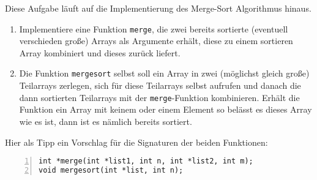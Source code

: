 \documentclass{uebungszettel}
\begin{document}
\begin{aufg}
Diese Aufgabe läuft auf die Implementierung des Merge-Sort Algorithmus hinaus.
\begin{enumerate}
\item Implementiere eine Funktion \verb|merge|, die zwei bereits sortierte (eventuell verschieden große) Arrays als Argumente erhält, diese zu einem sortieren Array kombiniert und dieses zurück liefert. 
\item Die Funktion \verb|mergesort| selbst soll ein Array in zwei (möglichst gleich große) Teilarrays zerlegen, sich für diese Teilarrays selbst aufrufen und danach die dann sortierten Teilarrays mit der \verb|merge|-Funktion kombinieren. Erhält die Funktion ein Array mit keinem oder einem Element so belässt es dieses Array wie es ist, dann ist es nämlich bereits sortiert.
\end{enumerate}

Hier als Tipp ein Vorschlag für die Signaturen der beiden Funktionen:
\begin{codelisting}
\begin{lstlisting}[numbers=left,numberstyle=\tiny,frame=tlrb]
int *merge(int *list1, int n, int *list2, int m);
void mergesort(int *list, int n);
\end{lstlisting}
\end{codelisting}
\end{aufg}
\end{document}
